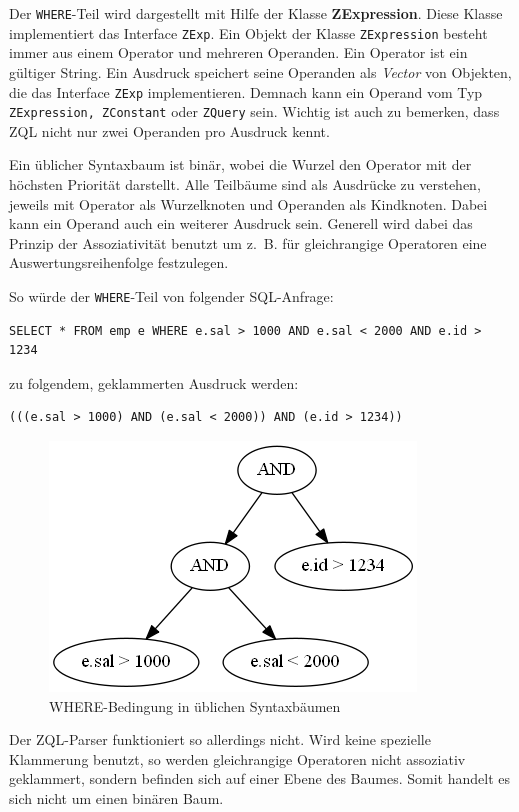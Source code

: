 Der \verb|WHERE|-Teil wird dargestellt mit Hilfe der Klasse \textbf{ZExpression}. Diese Klasse implementiert das Interface \verb|ZExp|. Ein Objekt der Klasse \verb|ZExpression| besteht immer aus einem Operator und mehreren Operanden. Ein Operator ist ein gültiger String. Ein Ausdruck speichert seine Operanden als \textit{Vector} von Objekten, die das Interface \verb|ZExp| implementieren. Demnach kann ein Operand vom Typ \verb|ZExpression, ZConstant| oder \verb|ZQuery| sein.
Wichtig ist auch zu bemerken, dass ZQL nicht nur zwei Operanden pro Ausdruck kennt. 

Ein üblicher Syntaxbaum ist binär, wobei die Wurzel den Operator mit der höchsten Priorität darstellt. Alle Teilbäume sind als Ausdrücke zu verstehen, jeweils mit Operator als Wurzelknoten und Operanden als Kindknoten. Dabei kann ein Operand auch ein weiterer Ausdruck sein. Generell wird dabei das Prinzip der Assoziativität benutzt um \mbox{z. B.} für gleichrangige Operatoren eine Auswertungsreihenfolge festzulegen.

So würde der \verb|WHERE|-Teil von folgender SQL-Anfrage:
\begin{verbatim}
SELECT * FROM emp e WHERE e.sal > 1000 AND e.sal < 2000 AND e.id > 1234
\end{verbatim}

zu folgendem, geklammerten Ausdruck werden:
\begin{verbatim}
(((e.sal > 1000) AND (e.sal < 2000)) AND (e.id > 1234))
\end{verbatim}

\begin{figure}[h]
\label{baum1}
\includegraphics[scale=0.7]{Bilder/where_syntax.png}
\caption{WHERE-Bedingung in üblichen Syntaxbäumen}
\end{figure}

Der ZQL-Parser funktioniert so allerdings nicht. Wird keine spezielle Klammerung benutzt, so werden gleichrangige Operatoren nicht assoziativ geklammert, sondern befinden sich auf einer Ebene des Baumes. Somit handelt es sich nicht um einen binären Baum. 

